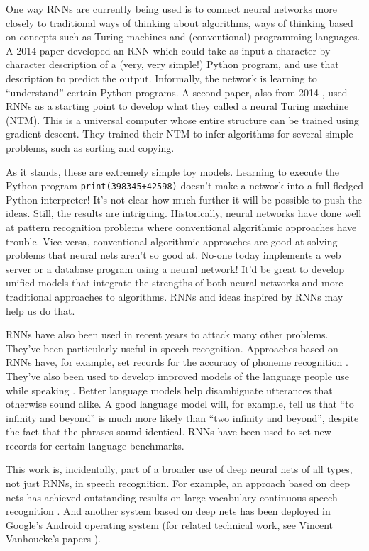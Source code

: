 One way RNNs are currently being used is to connect neural networks more closely to traditional ways of thinking about algorithms, ways of thinking based on concepts such as Turing machines and (conventional) programming languages. A 2014 paper \cite{ZarembaS14} developed an RNN which could take as input a character-by-character description of a (very, very simple!) Python program, and use that description to predict the output. Informally, the network is learning to ``understand'' certain Python programs. A second paper, also from 2014 \cite{GravesWD14}, used RNNs as a starting point to develop what they called a neural Turing machine (NTM). This is a universal computer whose entire structure can be trained using gradient descent. They trained their NTM to infer algorithms for several simple problems, such as sorting and copying.

As it stands, these are extremely simple toy models. Learning to execute the Python program \lstinline{print(398345+42598)} doesn't make a network into a full-fledged Python interpreter! It's not clear how much further it will be possible to push the ideas. Still, the results are intriguing. Historically, neural networks have done well at pattern recognition problems where conventional algorithmic approaches have trouble. Vice versa, conventional algorithmic approaches are good at solving problems that neural nets aren't so good at. No-one today implements a web server or a database program using a neural network! It'd be great to develop unified models that integrate the strengths of both neural networks and more traditional approaches to algorithms. RNNs and ideas inspired by RNNs may help us do that.

RNNs have also been used in recent years to attack many other problems. They've been particularly useful in speech recognition. Approaches based on RNNs have, for example, set records for the accuracy of phoneme recognition \cite{Gravesabs-1303-5778}. They've also been used to develop improved models of the language people use while speaking \cite{Mikolov2012}. Better language models help disambiguate utterances that otherwise sound alike. A good language model will, for example, tell us that ``to infinity and beyond'' is much more likely than ``two infinity and beyond'', despite the fact that the phrases sound identical. RNNs have been used to set new records for certain language benchmarks.

This work is, incidentally, part of a broader use of deep neural nets of all types, not just RNNs, in speech recognition. For example, an approach based on deep nets has achieved outstanding results on large vocabulary continuous speech recognition \cite{SainathKMDSSBAR13}. And another system based on deep nets has been deployed in Google's Android operating system \cite{McMillan2013} (for related technical work, see Vincent Vanhoucke's  papers \cite{Vanhoucke2019}).

